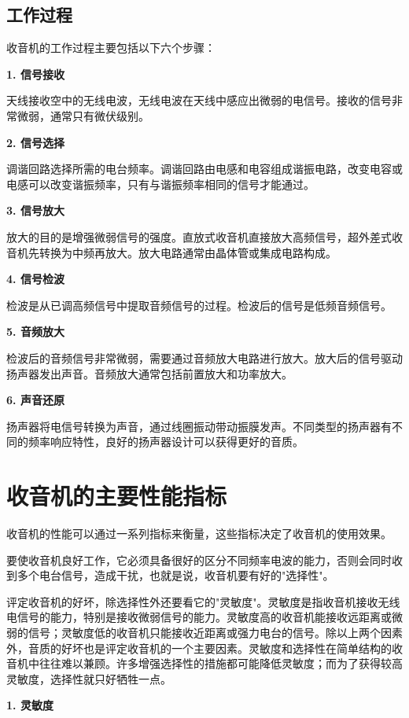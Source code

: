 \documentclass[12pt,UTF8]{ctexbook}
\begin{document}
\subsection{工作过程}

收音机的工作过程主要包括以下六个步骤：

\textbf{1. 信号接收}

天线接收空中的无线电波，无线电波在天线中感应出微弱的电信号。接收的信号非常微弱，通常只有微伏级别。

\textbf{2. 信号选择}

调谐回路选择所需的电台频率。调谐回路由电感和电容组成谐振电路，改变电容或电感可以改变谐振频率，只有与谐振频率相同的信号才能通过。

\textbf{3. 信号放大}

放大的目的是增强微弱信号的强度。直放式收音机直接放大高频信号，超外差式收音机先转换为中频再放大。放大电路通常由晶体管或集成电路构成。

\textbf{4. 信号检波}

检波是从已调高频信号中提取音频信号的过程。检波后的信号是低频音频信号。

\textbf{5. 音频放大}

检波后的音频信号非常微弱，需要通过音频放大电路进行放大。放大后的信号驱动扬声器发出声音。音频放大通常包括前置放大和功率放大。

\textbf{6. 声音还原}

扬声器将电信号转换为声音，通过线圈振动带动振膜发声。不同类型的扬声器有不同的频率响应特性，良好的扬声器设计可以获得更好的音质。

\section{收音机的主要性能指标}

收音机的性能可以通过一系列指标来衡量，这些指标决定了收音机的使用效果。

要使收音机良好工作，它必须具备很好的区分不同频率电波的能力，否则会同时收到多个电台信号，造成干扰，也就是说，收音机要有好的"选择性"。

评定收音机的好坏，除选择性外还要看它的"灵敏度"。灵敏度是指收音机接收无线电信号的能力，特别是接收微弱信号的能力。灵敏度高的收音机能接收远距离或微弱的信号；灵敏度低的收音机只能接收近距离或强力电台的信号。除以上两个因素外，音质的好坏也是评定收音机的一个主要因素。灵敏度和选择性在简单结构的收音机中往往难以兼顾。许多增强选择性的措施都可能降低灵敏度；而为了获得较高灵敏度，选择性就只好牺牲一点。

\textbf{1. 灵敏度}
\end{document}
